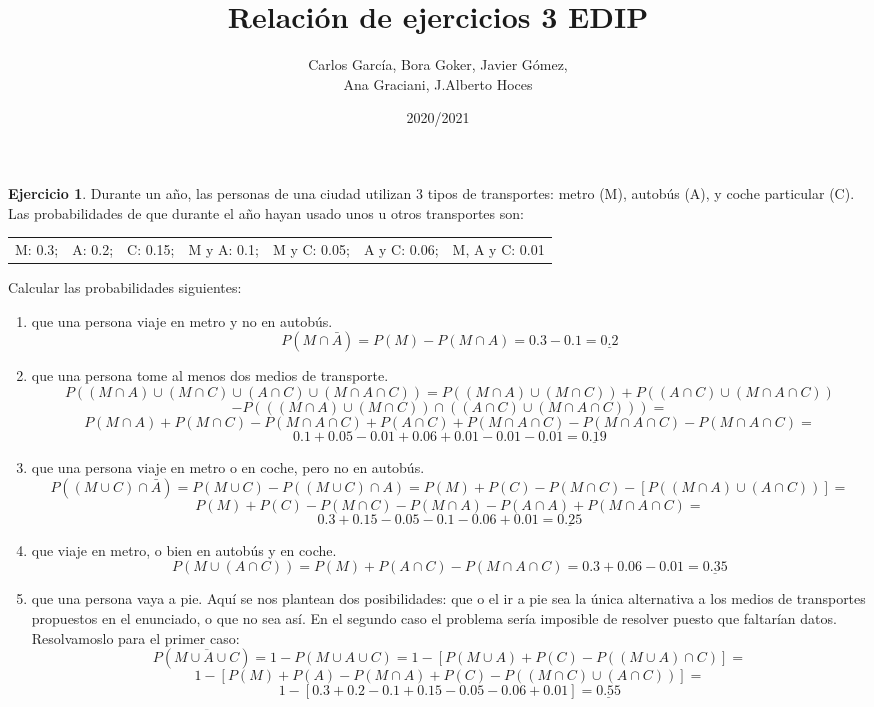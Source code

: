 \documentclass[a4paper, 12pt]{article}
\title{\textbf{Relación de ejercicios 3 EDIP}}
\author{Carlos García, Bora Goker, Javier Gómez,  \\ Ana Graciani, J.Alberto Hoces}
\date{2020/2021}
\theoremstyle{definition}
\newtheorem{ej}{Ejercicio}
\begin{document}
\maketitle

\begin{ej}
Durante un año, las personas de una ciudad utilizan 3 tipos de transportes: metro (M), autobús (A), y coche particular (C). Las probabilidades de que durante el año hayan usado unos u otros transportes son:

\medskip

\begin{tabular}{c c c c c c c}
	M: 0.3; & A: 0.2; & C: 0.15; & M y A: 0.1; & M y C: 0.05; & A y C: 0.06; & M, A y C: 0.01
\end{tabular} 

\medskip

Calcular las probabilidades siguientes:
\begin{enumerate}[label=\textit{\alph*)}]
	\item que una persona viaje en metro y no en autobús.
\[
	P(M \cap \bar{A}) = P(M) - P(M \cap A) = 0.3 - 0.1 = \underline{0.2}
\]
	\item que una persona tome al menos dos medios de transporte.
\[
	P((M \cap A) \cup (M \cap C) \cup (A \cap C) \cup (M \cap A \cap C)) = P((M \cap A) \cup (M \cap C)) + P((A \cap C) \cup (M \cap A \cap C)) 
\]
\[
	- P(((M \cap A) \cup (M \cap C)) \cap ((A \cap C) \cup (M \cap A \cap C))) =
\]
\[
	P(M \cap A) + P(M \cap C) - P(M \cap A \cap C) + P(A \cap C) + P(M \cap A \cap C) - P(M \cap A \cap C) - P(M \cap A \cap C) =
\]
\[
	0.1 + 0.05 - 0.01 + 0.06 + 0.01 - 0.01 - 0.01 = \underline{0.19}
\]
	\item que una persona viaje en metro o en coche, pero no en autobús.
\[
	P((M \cup C) \cap \bar{A}) = P(M \cup C) - P((M \cup C) \cap A) = P(M) + P(C) - P(M \cap C) - [P((M \cap A) \cup (A \cap C))] =
\]
\[
	P(M) + P(C) - P(M \cap C) - P(M \cap A) - P(A \cap A) + P(M \cap A \cap C) =
\]
\[
	0.3 + 0.15 - 0.05 - 0.1 - 0.06 + 0.01 = \underline{0.25}
\]
	\item que viaje en metro, o bien en autobús y en coche.
\[
	P(M \cup (A \cap C)) = P(M) + P(A \cap C) - P(M \cap A \cap C) = 0.3 + 0.06 - 0.01 = \underline{0.35}
\]
	\item que una persona vaya a pie.
	Aquí se  nos plantean dos posibilidades: que o el ir a pie sea la única alternativa a los medios de transportes propuestos en el enunciado, o que no sea así. En el segundo caso el problema sería imposible de resolver puesto que faltarían datos. Resolvamoslo para el primer caso:
\[
	P(\overline{M \cup A \cup C}) = 1 - P(M \cup A \cup C) = 1 - [P(M \cup A) + P(C) - P((M \cup A) \cap C)] = 
\]
\[
	1 - [P(M) + P(A) - P(M \cap A) + P(C) - P((M \cap C) \cup (A \cap C))] =
\]
\[
	1 - [0.3 + 0.2 - 0.1 + 0.15 - 0.05 - 0.06 + 0.01] = \underline{0.55}
\]
\end{enumerate}
\end{ej}
\end{document}
